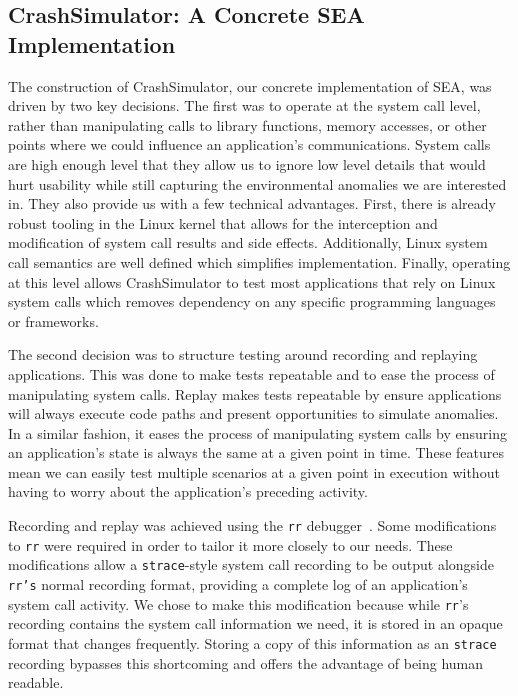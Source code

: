 \subsection{CrashSimulator: A Concrete SEA Implementation}
\label{SUBSEC:ApproachCrashSim}
The construction of CrashSimulator,
our concrete implementation of SEA,
was driven by two key decisions.
The first
was to operate at the system call level,
rather than manipulating
calls to library functions, memory accesses, or other points where we could
influence an application's communications.
System calls are high enough level that they allow us
to ignore low level details that would hurt usability while still
capturing the environmental anomalies we are interested in.
They also provide us with a
few technical advantages.
First, there is already robust tooling in the Linux
kernel that allows for the interception and modification of system call
results and side effects.  Additionally, Linux system call semantics are
well defined which simplifies implementation. Finally, operating at this
level allows CrashSimulator to test most applications that rely on Linux
system calls which removes dependency on any specific programming languages
or frameworks.

The second decision was to structure testing around recording and replaying
applications.  This was done to make tests repeatable and to ease
the process of manipulating system calls.
Replay makes tests repeatable by ensure applications will always execute
code paths and present opportunities to simulate anomalies.  In a similar
fashion, it eases the process of manipulating system calls by ensuring an
application's state is always the same at a given point in time.
These features mean we can easily test multiple scenarios at a given point
in execution without having to worry about the application's preceding
activity.

Recording and replay was
achieved using the {\tt rr} debugger~\cite{rrwebsite}.
Some modifications to {\tt rr} were required in order to
tailor it more closely to our needs.
These modifications allow
a {\tt strace}-style
system call recording to be output alongside {\tt rr's} normal recording
format, providing
a complete log of an application's system call activity.
We chose to make this
modification because
while {\tt rr}'s recording contains the system call information we need,
it is stored in an opaque format that changes frequently.
Storing a copy of this information as an {\tt strace} recording bypasses
this shortcoming and offers the advantage of being human readable.


